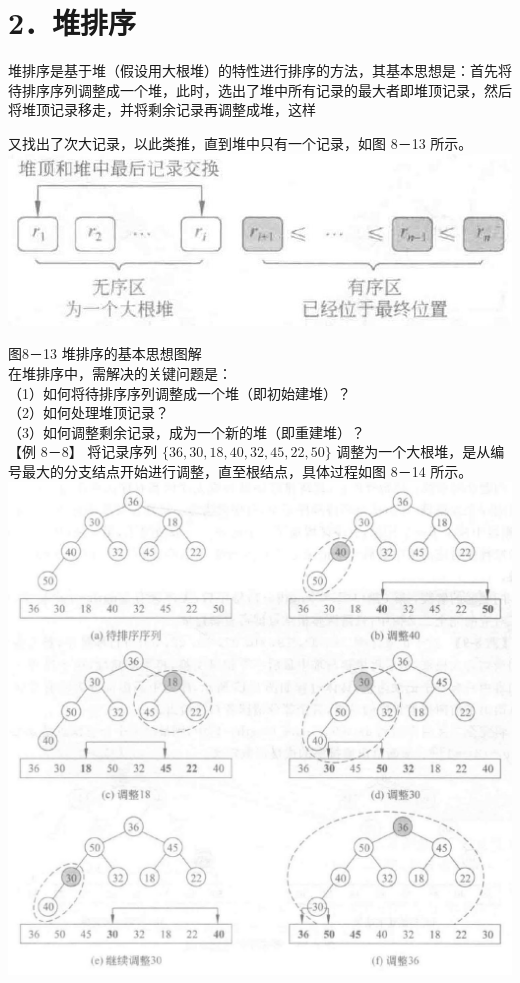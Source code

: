 \documentclass[10pt]{article}
\begin{document}
\section*{2．堆排序}
堆排序是基于堆（假设用大根堆）的特性进行排序的方法，其基本思想是：首先将待排序序列调整成一个堆，此时，选出了堆中所有记录的最大者即堆顶记录，然后将堆顶记录移走，并将剩余记录再调整成堆，这样

又找出了次大记录，以此类推，直到堆中只有一个记录，如图 8－13 所示。\\
\includegraphics[max width=\textwidth, center]{2025_06_06_704745ea57b15b2333e5g-284}

图8－13 堆排序的基本思想图解\\
在堆排序中，需解决的关键问题是：\\
（1）如何将待排序序列调整成一个堆（即初始建堆）？\\
（2）如何处理堆顶记录？\\
（3）如何调整剩余记录，成为一个新的堆（即重建堆）？\\
【例 8－8】 将记录序列 $\{36,30,18,40,32,45,22,50\}$ 调整为一个大根堆，是从编号最大的分支结点开始进行调整，直至根结点，具体过程如图 8－14 所示。\\
\includegraphics[max width=\textwidth, center]{2025_06_06_704745ea57b15b2333e5g-284(1)}
\end{document}
